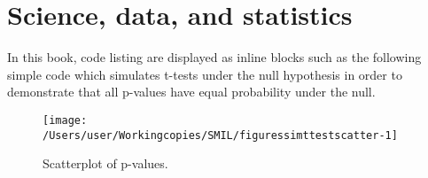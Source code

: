 \documentclass[output=inprep,
  nonflat,
  modfonts,
  showindex,
  draftmode
]{langsci/langscibook}\usepackage[]{graphicx}\usepackage[]{color}
\makeatletter
\def\maxwidth{ %
  \ifdim\Gin@nat@width>\linewidth
    \linewidth
  \else
    \Gin@nat@width
  \fi
}
\makeatother
\begin{document}
     

 
 
\maketitle                
\frontmatter

\tableofcontents


 
\mainmatter         




\chapter{Science, data, and statistics}
\label{sec:sciencedataandstatistics}

\cite{MacDonaldGardner2000}






\pagebreak

In this book, code listing are displayed as inline blocks such as the following simple code which simulates t-tests under the null hypothesis in order to demonstrate that all p-values have equal probability under the null.

\begin{Schunk}
\end{Schunk}


\begin{Schunk}
\begin{figure}[H]

{\centering \texttt{[image: /Users/user/Workingcopies/SMIL/figuressimttestscatter-1]} 

}

\caption[Scatterplot of p-values]{Scatterplot of p-values.}\label{fig:simttestscatter}
\end{figure}
\end{Schunk}
\end{document}
